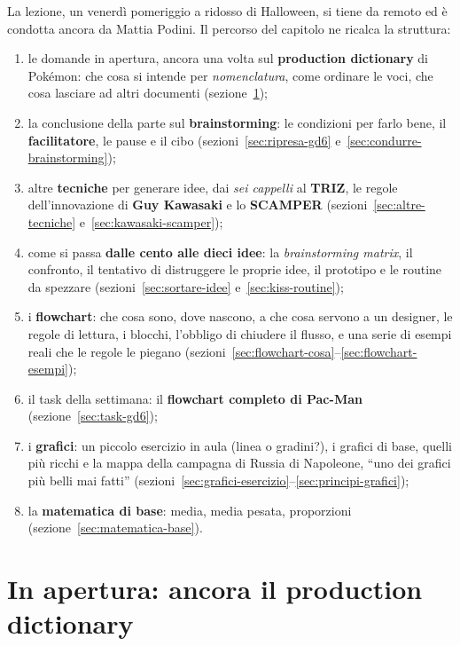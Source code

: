 La lezione, un venerdì pomeriggio a ridosso di Halloween, si tiene da remoto
ed è condotta ancora da Mattia Podini. Il percorso del capitolo ne ricalca la
struttura:
\begin{enumerate}
  \item le domande in apertura, ancora una volta sul \textbf{production
        dictionary} di Pokémon: che cosa si intende per
        \emph{nomenclatura}, come ordinare le voci, che cosa lasciare ad
        altri documenti (sezione~\ref{sec:pd-gd6});
  \item la conclusione della parte sul \textbf{brainstorming}: le condizioni
        per farlo bene, il \textbf{facilitatore}, le pause e il cibo
        (sezioni~\ref{sec:ripresa-gd6} e~\ref{sec:condurre-brainstorming});
  \item altre \textbf{tecniche} per generare idee, dai \emph{sei cappelli} al
        \textbf{TRIZ}, le regole dell'innovazione di \textbf{Guy Kawasaki} e lo
        \textbf{SCAMPER} (sezioni~\ref{sec:altre-tecniche}
        e~\ref{sec:kawasaki-scamper});
  \item come si passa \textbf{dalle cento alle dieci idee}: la
        \emph{brainstorming matrix}, il confronto, il tentativo di
        distruggere le proprie idee, il prototipo e le routine da spezzare
        (sezioni~\ref{sec:sortare-idee} e~\ref{sec:kiss-routine});
  \item i \textbf{flowchart}: che cosa sono, dove nascono, a che cosa servono
        a un designer, le regole di lettura, i blocchi, l'obbligo di chiudere
        il flusso, e una serie di esempi reali che le regole le piegano
        (sezioni~\ref{sec:flowchart-cosa}--\ref{sec:flowchart-esempi});
  \item il task della settimana: il \textbf{flowchart completo di Pac-Man}
        (sezione~\ref{sec:task-gd6});
  \item i \textbf{grafici}: un piccolo esercizio in aula (linea o gradini?),
        i grafici di base, quelli più ricchi e la mappa della campagna di
        Russia di Napoleone, ``uno dei grafici più belli mai fatti''
        (sezioni~\ref{sec:grafici-esercizio}--\ref{sec:principi-grafici});
  \item la \textbf{matematica di base}: media, media pesata, proporzioni
        (sezione~\ref{sec:matematica-base}).
\end{enumerate}

\section{In apertura: ancora il production dictionary}
\label{sec:pd-gd6}

